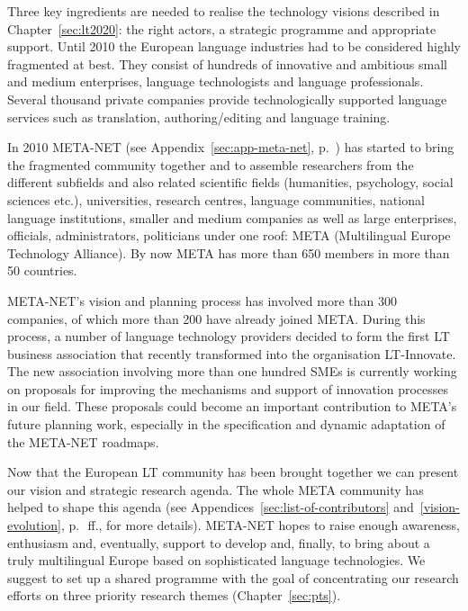 \documentclass[10pt, plain]{../../metanetpaper}
\begin{document}
\begin{multicols}{2}
Three key ingredients are needed to realise the technology visions described in Chapter~\ref{sec:lt2020}: the right actors, a strategic programme and appropriate support. Until 2010 the European language industries had to be considered highly fragmented at best. They consist of hundreds of innovative and ambitious small and medium enterprises, language technologists and language professionals. Several thousand private companies provide technologically supported language services such as translation, authoring/editing and language training. 

In 2010 META-NET (see Appendix~\ref{sec:app-meta-net}, p.~\pageref{sec:app-meta-net}) has started to bring the fragmented community together and to assemble researchers from the different subfields and also related scientific fields (humanities, psychology, social sciences etc.), universities, research centres, language communities, national language institutions, smaller and medium companies as well as large enterprises, officials, administrators, politicians under one roof: META (Multilingual Europe Technology Alliance). By now META has more than 650 members in more than 50 countries. 

META-NET's vision and planning process has involved more than 300 companies, of which more than 200 have already joined META. During this process, a number of language technology providers decided to form the first LT business association that recently transformed into the organisation LT-Innovate. The new association involving more than one hundred SMEs is currently working on proposals for improving the mechanisms and support of innovation processes in our field. These proposals could become an important contribution to META's future planning work, especially in the specification and dynamic adaptation of the META-NET roadmaps.

Now that the European LT community has been brought together we can present our vision and strategic research agenda. The whole META community has helped to shape this agenda (see Appendices~\ref{sec:list-of-contributors} and~\ref{vision-evolution}, p.~\pageref{sec:list-of-contributors}\,ff., for more details). META-NET hopes to raise enough awareness, enthusiasm and, eventually, support to develop and, finally, to bring about a truly multilingual Europe based on sophisticated language technologies. We suggest to set up a shared programme with the goal of concentrating our research efforts on three priority research themes (Chapter~\ref{sec:pts}).  
\end{multicols}
\end{document}

